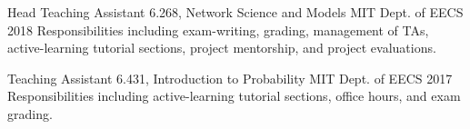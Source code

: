 \begin{cventries}
  \cventry
    {Head Teaching Assistant} %
    {6.268, Network Science and Models} %
    {MIT Dept. of EECS} %
    {2018} %
    {Responsibilities including exam-writing, grading, management of TAs, active-learning tutorial sections, project mentorship, and project evaluations.}  

\cventry
    {Teaching Assistant} %
    {6.431, Introduction to Probability} %
    {MIT Dept. of EECS} %
    {2017} %
    {Responsibilities including active-learning tutorial sections, office hours, and exam grading.}  
    

\end{cventries}
